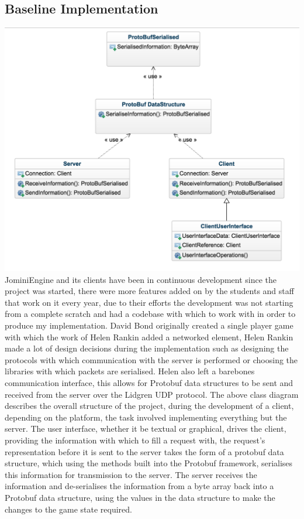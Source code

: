 \documentclass{article}
\begin{document}
\subsection{Baseline Implementation}
\includegraphics[width=\textwidth]{classdiagram.png}
JominiEngine and its clients have been in continuous development since the project was started, there were more features added on by the students and staff that work on it every year, due to their efforts the development was not starting from a complete scratch and had a codebase with which to work with in order to produce my implementation. David Bond originally created a single player game with which the work of Helen Rankin\cite{helenrankin} added a networked element, Helen Rankin made a lot of design decisions during the implementation such as designing the protocols with which communication with the server is performed or choosing the libraries with which packets are serialised. Helen also left a barebones communication interface, this allows for Protobuf data structures to be sent and received from the server over the Lidgren UDP protocol. The above class diagram describes the overall structure of the project, during the development of a client, depending on the platform, the task involved implementing everything but the server. The user interface, whether it be textual or graphical, drives the client, providing the information with which to fill a request with, the request's representation before it is sent to the server takes the form of a protobuf data structure, which using the methods built into the Protobuf framework, serialises this information for transmission to the server. The server receives the information and de-serialises the information from a byte array back into a Protobuf data structure, using the values in the data structure to make the changes to the game state required.
\end{document}

